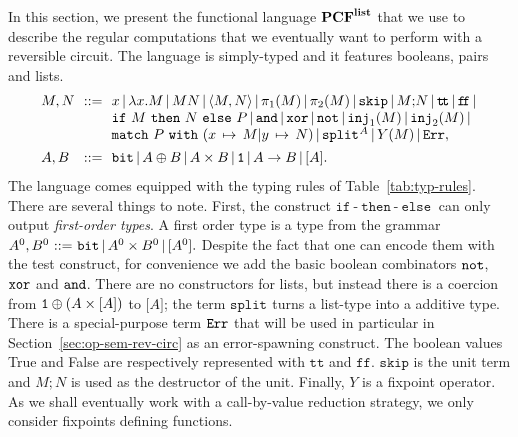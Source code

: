 \documentclass{article}
\theoremstyle{plain}
\theoremstyle{definition}
\newcommand{\PCF}{\mbox{${\bf PCF}^{\bf list}$}}
\newcommand{\bit}{{\tt bit}}
\newcommand{\define}[1]{{\em #1}}
\newcommand{\bor}{\,{|}\,}
\newcommand{\listtype}[1]{{[}{#1}{]}}
\newcommand{\unittype}{{\tt 1}}
\newcommand{\tunit}{\unittype}
\newcommand{\punit}{\mathtt{skip}}\newcommand{\prodterm}[1]{{\langle{#1}\rangle}}
\newcommand{\letunitterm}[2]{{#1}\mathtt{;}{#2}}
\newcommand{\ttrue}{\mathtt{t\!t}}
\newcommand{\ffalse}{\mathtt{f\!f}}
\newcommand{\iftermx}[3]{{{\mathtt{if}}~{#1}~\mathtt{then}~{#2}~\mathtt{else}~{#3}}}
\newcommand{\inj}{{\tt inj}}
\newcommand{\match}[5]{{{\mathtt{match}}~{#1}~{\mathtt{with}}~({#2\,\mapsto\,#3}\vert{#4\,\mapsto\,#5})}}
\newcommand{\errorlist}{{\tt Err}}
\newcommand{\splitlist}[1][]{{\mathtt{split}^{#1}}}
\begin{document}
In this section, we present the functional language \PCF{} that we use
to describe the regular computations that we eventually want to
perform with a reversible circuit. The language is simply-typed and it
features booleans, pairs and lists.
\[
\begin{array}{l@{~~}l@{~~}l}
  M,N & {:}{:}{=} &
  x \bor
  \lambda x.M \bor
  MN \bor
  \prodterm{M,N} \bor
  \pi_1(M) \bor
  \pi_2(M) \bor
  \punit \bor
  \letunitterm{M}{N} \bor
  \ttrue \bor
  \ffalse \bor
  \\
  &&
  \iftermx{M}{N}{P} \bor
  {\tt and} \bor {\tt xor} \bor {\tt not} \bor
  \inj_1(M) \bor \inj_2(M) \bor
  \\
  &&
  \match{P}{x}{M}{y}{N} \bor
  \splitlist^A \bor
  Y(M)
  \bor\errorlist,
  \\[1ex]
  A,B & {:}{:}{=} &
  \bit \bor A \oplus B \bor A\times B \bor 
  \unittype \bor A \to B \bor \listtype{A}.
\end{array}
\]
The language comes equipped with the typing rules of
Table~\ref{tab:typ-rules}. There are several things to note.  First,
the construct $\iftermx{\!\textrm{-}\!}{\!\textrm{-}\!}{}$
can only output \define{first-order
  types}. A first order type is a type from the
grammar
$
A^0,B^0~ {:}{:}{=} ~ \bit \bor A^0\times B^0 \bor \listtype{A^0}.
$
Despite the fact that one can encode them with the test construct, for
convenience we
add the basic boolean combinators ${\tt not}$, ${\tt
  xor}$ and ${\tt and}$.
There are no constructors for lists, but instead
there is a coercion from $\tunit\oplus(A\times\listtype{A})$ to
$\listtype{A}$; the term $\splitlist$ turns a list-type into a
additive type. There is a special-purpose term $\errorlist$ that
will be used in particular in Section~\ref{sec:op-sem-rev-circ} as an
error-spawning construct. The boolean values True and False are
respectively represented with $\ttrue$ and $\ffalse$. $\punit$ is the unit term and
$\letunitterm{M}{N}$ is used as the destructor of the unit. 
Finally, $Y$ is a fixpoint operator. As we shall eventually work with
a call-by-value reduction strategy, we only consider fixpoints
defining functions.
\end{document}
